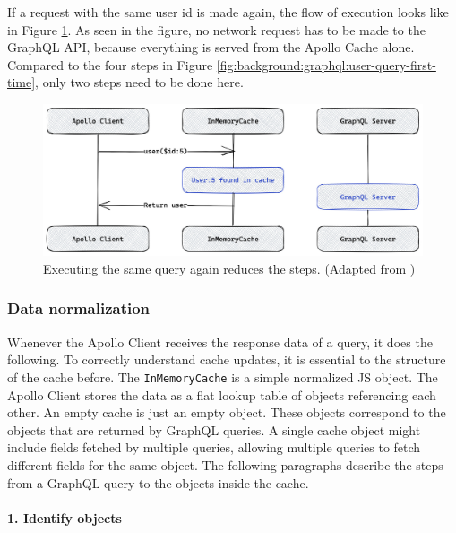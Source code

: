 \noindent If a request with the same user id is made again, the flow of execution looks like in Figure \ref{fig:background:graphql:user-query-second-time}. As seen in the figure, no network request has to be made to the GraphQL \ac{API}, because everything is served from the Apollo Cache alone. Compared to the four steps in Figure \ref{fig:background:graphql:user-query-first-time}, only two steps need to be done here. \cite{misc:-:background:graphql:apollo-client-cache-overview}

\ifshowImages
\begin{figure}[H]
    \centering
    \includegraphics[width=0.7\linewidth]{images/background/graphql/apollo/apollo-client-basic-cache-warm.jpg}
    \caption{Executing the same query again reduces the steps. (Adapted from \cite{misc:-:background:graphql:apollo-client-cache-overview})}\label{fig:background:graphql:user-query-second-time}
\end{figure}
\fi

\subsubsection{Data normalization}\label{subsubsection:background:graphql:apollo-server-client:data-normalization}

Whenever the Apollo Client receives the response data of a query, it does the following. To correctly understand cache updates, it is essential to the structure of the cache before. The \texttt{InMemoryCache} is a simple normalized \ac{JS} object. The Apollo Client stores the data as a flat lookup table of objects referencing each other. An empty cache is just an empty object. These objects correspond to the objects that are returned by GraphQL queries. A single cache object might include fields fetched by multiple queries, allowing multiple queries to fetch different fields for the same object. \cite{misc:-:background:graphql:apollo-client-cache-overview} The following paragraphs describe the steps from a GraphQL query to the objects inside the cache.

\paragraph{1. Identify objects}\label{paragraph:background:graphql:apollo-server-client:data-normalization:identify-objects}


